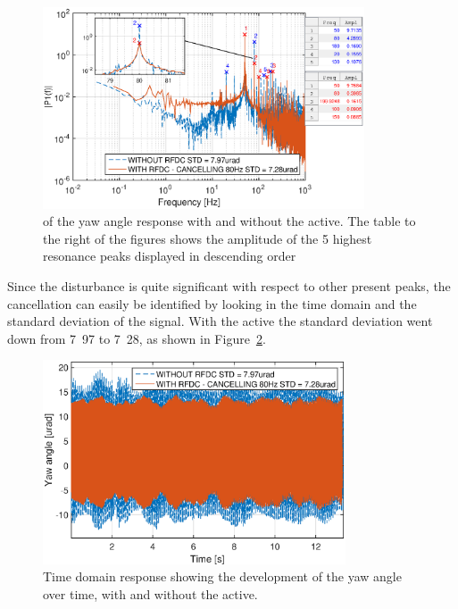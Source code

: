 \begin{figure}[h]
  \centering %
  \includegraphics[width=0.85\textwidth]{fig/matlab/fft_openloop_ext_disturbance_80Hz_with_zoom}
  \caption{\label{fig:fft_openloop_80} \abbrFFT of the yaw angle response with and without the \abbrRFDC active. The table to the right of the figures shows the amplitude of the 5 highest resonance peaks displayed in descending order}
\end{figure}

Since the disturbance is quite significant with respect to other present peaks, the cancellation can easily be identified by looking in the time domain and the standard deviation of the signal. With the \abbrRFDC active the standard deviation went down from \unit{7.97}{\micro\radian} to \unit{7.28}{\micro\radian}, as shown in Figure~\ref{fig:yl_openloop_80}.

\begin{figure}[h]
  \centering %
  \includegraphics[width=0.8\textwidth]{fig/matlab/yl_openloop_ext_disturbance_80Hz}
  \caption{\label{fig:yl_openloop_80} Time domain response showing the development of the yaw angle over time, with and without the \abbrRFDC active.}
\end{figure}

